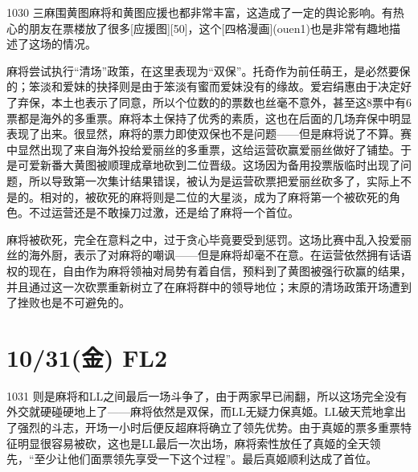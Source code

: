 1030 三麻围黄图麻将和黄图应援也都非常丰富，这造成了一定的舆论影响。有热心的朋友在票楼放了很多[应援图][50]，这个[四格漫画](ouen1)也是非常有趣地描述了这场的情况。

麻将尝试执行“清场”政策，在这里表现为“双保”。托奇作为前任萌王，是必然要保的；笨淡和爱妹的抉择则是由于笨淡有蜜而爱妹没有的缘故。爱宕绢惠由于决定好了弃保，本土也表示了同意，所以个位数的的票数也丝毫不意外，甚至这8票中有6票都是海外的多重票。麻将本土保持了优秀的素质，这也在后面的几场弃保中明显表现了出来。很显然，麻将的票力即使双保也不是问题——但是麻将说了不算。赛中显然出现了来自海外投给爱丽丝的多重票，这给运营砍赢爱丽丝做好了铺垫。于是可爱新番大黄图被顺理成章地砍到二位晋级。这场因为备用投票版临时出现了问题，所以导致第一次集计结果错误，被认为是运营砍票把爱丽丝砍多了，实际上不是的。相对的，被砍死的麻将则是二位的大星淡，成为了麻将第一个被砍死的角色。不过运营还是不敢操刀过激，还是给了麻将一个首位。

麻将被砍死，完全在意料之中，过于贪心毕竟要受到惩罚。这场比赛中乱入投爱丽丝的海外厨，表示了对麻将的嘲讽——但是麻将却毫不在意。在运营依然拥有话语权的现在，自由作为麻将领袖对局势有着自信，预料到了黄图被强行砍赢的结果，并且通过这一次砍票重新树立了在麻将群中的领导地位；末原的清场政策开场遭到了挫败也是不可避免的。

\section{10/31(金) FL2}


1031 则是麻将和LL之间最后一场斗争了，由于两家早已闹翻，所以这场完全没有外交就硬碰硬地上了——麻将依然是双保，而LL无疑力保真姬。LL破天荒地拿出了强烈的斗志，开场一小时后便反超麻将确立了领先优势。由于真姬的票多重票特征明显很容易被砍，这也是LL最后一次出场，麻将索性放任了真姬的全天领先，“至少让他们面票领先享受一下这个过程”。最后真姬顺利达成了首位。

